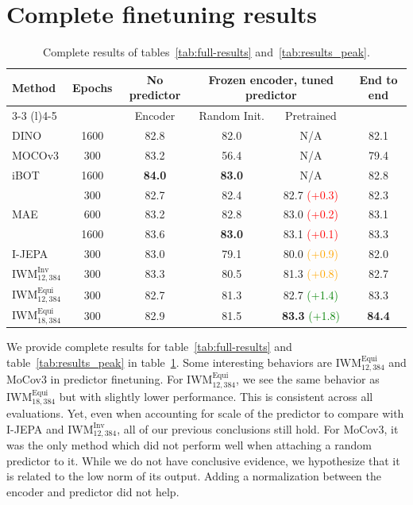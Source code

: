 \documentclass[twocolumn]{fairmeta}
\theoremstyle{plain}
\theoremstyle{definition}
\theoremstyle{remark}
\begin{document}
\section{Complete finetuning results}
\begin{table}[!h]
\centering
    \caption{Complete results of tables~\ref{tab:full-results} and~\ref{tab:results_peak}.}
    \label{tab:full-results-appdx}
\begin{tabular}{lccccc}
\toprule
\multirow{2}{*}{Method} & \multirow{2}{*}{Epochs} & \multicolumn{1}{c}{No predictor} & \multicolumn{2}{c}{Frozen encoder, tuned predictor}  & \multirow{2}{*}{End to end}  \\
\cmidrule(l){3-3} \cmidrule(l){4-5}
& & Encoder & Random Init. & Pretrained &   \\
\midrule
DINO & 1600 & 82.8 & 82.0 & N/A & 82.1 \\
MOCOv3 & 300 & 83.2 & 56.4 & N/A & 79.4  \\
iBOT& 1600 & \textbf{84.0} & \textbf{83.0} & N/A & 82.8 \\
\multirow{ 3}{*}{MAE} & 300  & 82.7 & 82.4 & 82.7 \textcolor{Red}{(+0.3)} & 82.3  \\
& 600  & 83.2 & 82.8 & 83.0 \textcolor{Red}{(+0.2)} & 83.1  \\
& 1600  & 83.6 &  \textbf{83.0} & 83.1 \textcolor{Red}{(+0.1)} & 83.3  \\
\multirow{ 1}{*}{I-JEPA} & 300 & 83.0 & 79.1 & 80.0 \textcolor{orange}{(+0.9)} & 82.0   \\
 \midrule
\multirow{ 1}{*}{$\text{IWM}_{12,384}^\text{Inv}$} & 300  & 83.3 & 80.5 & 81.3 \textcolor{orange}{(+0.8)} & 82.7  \\
$\text{IWM}_{12,384}^\text{Equi}$ & 300 & 82.7 & 81.3 & 82.7 \textcolor{Green}{(+1.4)} & 83.3  \\
$\text{IWM}_{18,384}^\text{Equi}$ & 300 & 82.9 & 81.5 & \textbf{83.3} \textcolor{Green}{(+1.8)} &  \textbf{84.4} \\

\bottomrule
\end{tabular}

\end{table}

We provide complete results for table~\ref{tab:full-results} and table~\ref{tab:results_peak} in table~\ref{tab:full-results-appdx}. Some interesting behaviors are $\text{IWM}_{12,384}^\text{Equi}$ and MoCov3 in predictor finetuning. For $\text{IWM}_{12,384}^\text{Equi}$, we see the same behavior as $\text{IWM}_{18,384}^\text{Equi}$ but with slightly lower performance. This is consistent across all evaluations. Yet, even when accounting for scale of the predictor to compare with I-JEPA and $\text{IWM}_{12,384}^\text{Inv}$, all of our previous conclusions still hold.
For MoCov3, it was the only method which did not perform well when attaching a random predictor to it. While we do not have conclusive evidence, we hypothesize that it is related to the low norm of its output. Adding a normalization between the encoder and predictor did not help.
\end{document}
